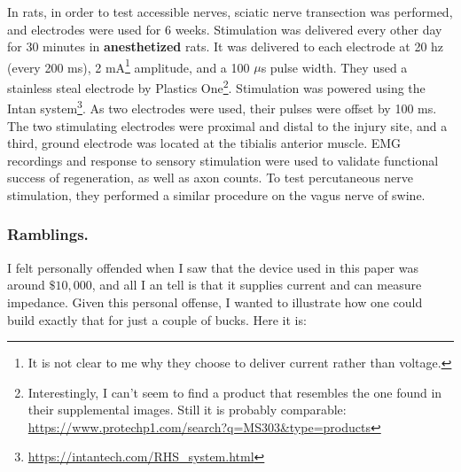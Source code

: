 \documentclass[12pt]{report}
\begin{document}
In rats, in order to test accessible nerves, sciatic nerve transection was performed, and electrodes were used for 6 weeks. Stimulation was delivered every other day for 30 minutes in \textbf{anesthetized} rats. It was delivered to each electrode at 20 hz (every 200 ms), 2 mA\footnote{It is not clear to me why they choose to deliver current rather than voltage.} amplitude, and a 100 $\mu$s pulse width. They used a stainless steal electrode by Plastics One\footnote{Interestingly, I can't seem to find a product that resembles the one found in their supplemental images. Still it is probably comparable: \url{https://www.protechp1.com/search?q=MS303\&type=products}}. Stimulation was powered using the Intan system\footnote{\url{https://intantech.com/RHS_system.html}}. As two electrodes were used, their pulses were offset by 100 ms. The two stimulating electrodes were proximal and distal to the injury site, and a third, ground electrode was located at the tibialis anterior muscle. EMG recordings and response to sensory stimulation were used to validate functional success of regeneration, as well as axon counts. To test percutaneous nerve stimulation, they performed a similar procedure on the vagus nerve of swine.  
\subsubsection{Ramblings.}

I felt personally offended when I saw that the device used in this paper was around $\$10,000$, and all I an tell is that it supplies current and can measure impedance. Given this personal offense, I wanted to illustrate how one could build exactly that for just a couple of bucks. Here it is: 
\end{document}
